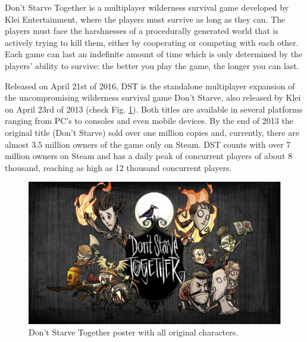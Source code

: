 \cleardoublepage
\label{chapter:case-study-dst}

\noindent Don't Starve Together is a multiplayer wilderness survival game developed by Klei Entertainment, where the players must survive as long as they can.
The players must face the harshnesses of a procedurally generated world that is actively trying to kill them, either by cooperating or competing with each other.
Each game can last an indefinite amount of time which is only determined by the players' ability to survive: the better you play the game, the longer you can last.

Released on April 21st of 2016, \ac{DST} is the standalone multiplayer expansion of the uncompromising wilderness survival game Don't Starve, also released by Klei on April 23rd of 2013 (check Fig. \ref{fig:don't-starve-together-poster}).
Both titles are available in several platforms ranging from PC's to consoles and even mobile devices.
By the end of 2013 the original title (Don't Starve) sold over one million copies and, currently, there are almost 3.5 million owners of the game only on Steam.
\ac{DST} counts with over 7 million owners on Steam and has a daily peak of concurrent players of about 8 thousand, reaching as high as 12 thousand concurrent players.

\begin{figure}
  \centering
  \includegraphics[width=\textwidth]{./Images/dont-starve-together-poster}
  \caption{Don't Starve Together poster with all original characters.}
  \label{fig:don't-starve-together-poster}
\end{figure}

